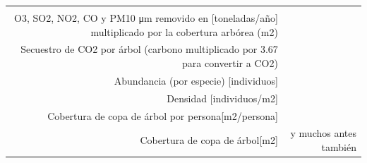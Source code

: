 \documentclass[12pt,]{book}
\begin{document}
\begin{longtable}[]{@{}rr@{}}
\begin{minipage}[t]{0.31\columnwidth}
\citep{gomez-baggethun_classifying_2013}\strut
\end{minipage}\tabularnewline
\begin{minipage}[t]{0.57\columnwidth}\raggedleft\strut
O3, SO2, NO2, CO y PM10 μm removido en {[}toneladas/año{]} multiplicado
por la cobertura arbórea (m2)\strut
\end{minipage} & \begin{minipage}[t]{0.31\columnwidth}\raggedleft\strut
\citep{gomez-baggethun_classifying_2013}\strut
\end{minipage}\tabularnewline
\begin{minipage}[t]{0.57\columnwidth}\raggedleft\strut
Secuestro de CO2 por árbol (carbono multiplicado por 3.67 para convertir
a CO2)\strut
\end{minipage} & \begin{minipage}[t]{0.31\columnwidth}\raggedleft\strut
\citep{gomez-baggethun_classifying_2013}\strut
\end{minipage}\tabularnewline
\begin{minipage}[t]{0.57\columnwidth}\raggedleft\strut
Abundancia (por especie) {[}individuos{]}\strut
\end{minipage} & \begin{minipage}[t]{0.31\columnwidth}\raggedleft\strut
\citep{alanis_estructura_2014}\strut
\end{minipage}\tabularnewline
\begin{minipage}[t]{0.57\columnwidth}\raggedleft\strut
Densidad {[}individuos/m2{]}\strut
\end{minipage} & \begin{minipage}[t]{0.31\columnwidth}\raggedleft\strut
\citep{nowak_sustaining_2010}\strut
\end{minipage}\tabularnewline
\begin{minipage}[t]{0.57\columnwidth}\raggedleft\strut
Cobertura de copa de árbol por persona{[}m2/persona{]}\strut
\end{minipage} & \begin{minipage}[t]{0.31\columnwidth}\raggedleft\strut
\citep{nowak_sustaining_2010}\strut
\end{minipage}\tabularnewline
\begin{minipage}[t]{0.57\columnwidth}\raggedleft\strut
Cobertura de copa de árbol{[}m2{]}\strut
\end{minipage} & \begin{minipage}[t]{0.31\columnwidth}\raggedleft\strut
\citep{nowak_sustaining_2010} y muchos antes también\strut
\end{minipage}\tabularnewline

\end{longtable}
\end{document}
